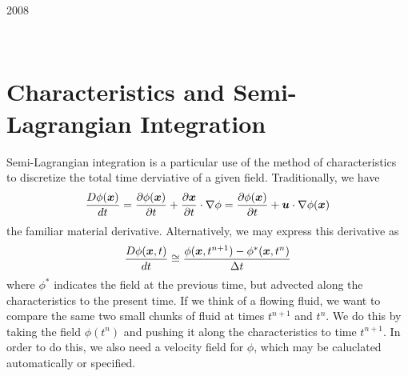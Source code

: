 \documentclass[twoside,12pt]{../sty/report_petsc}
\newcommand{\sindex}[1]{\index{#1}}
\newcommand{\x}{\mbox{\boldmath \(x\)}}
\newcommand{\vu}{\mbox{\boldmath \(u\)}}
\begin{document}
{}{2008}

\newpage

\hbox{ }

\vspace{1in}
\date{\today}

\newpage

\chapter{Characteristics and Semi-Lagrangian Integration}
\label{chapter_characteristics}
\sindex{characteristics}

    Semi-Lagrangian integration is a particular use of the method of characteristics to discretize the total time
derviative of a given field. Traditionally, we have
\begin{equation}
  {D\phi(\x) \over dt} = {\partial\phi(\x) \over \partial t} + {\partial\x \over \partial t} \cdot \nabla\phi
  = {\partial\phi(\x) \over \partial t} + \vu \cdot \nabla\phi(\x)
\end{equation}
the familiar material derivative. Alternatively, we may express this derivative as
\begin{equation}
  {D\phi(\x,t) \over dt} \cong {\phi(\x,t^{n+1}) - \phi^*(\x,t^n)\over \Delta t}
\end{equation}
where $\phi^*$ indicates the field at the previous time, but advected along the characteristics to the present time. If
we think of a flowing fluid, we want to compare the same two small chunks of fluid at times $t^{n+1}$ and $t^n$. We do
this by taking the field $\phi(t^n)$ and pushing it along the characteristics to time $t^{n+1}$. In order to do this, we
also need a velocity field for $\phi$, which may be caluclated automatically or specified.
\end{document}
